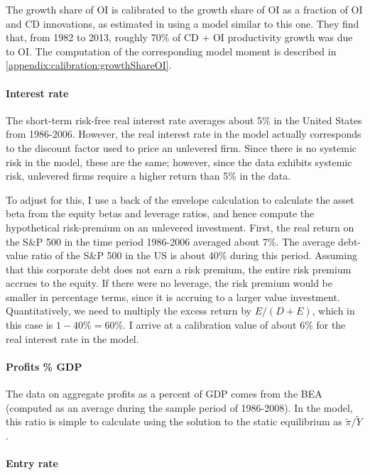 \documentclass[11pt,english]{article}
\begin{document}
The growth share of OI is calibrated to the growth share of OI as a fraction of OI and CD innovations, as estimated in \cite{klenow_innovative_2020} using a model similar to this one. They find that, from 1982 to 2013, roughly 70\% of CD + OI productivity growth was due to OI. The computation of the corresponding model moment is described in \ref{appendix:calibration:growthShareOI}.


\paragraph{Interest rate}

The short-term risk-free real interest rate averages about 5\% in the United States from 1986-2006. However, the real interest rate in the model actually corresponds to the discount factor used to price an unlevered firm. Since there is no systemic risk in the model, these are the same; however, since the data exhibits systemic risk, unlevered firms require a higher return than 5\% in the data. 

To adjust for this, I use a back of the envelope calculation to calculate the asset beta from the equity betas and leverage ratios, and hence compute the hypothetical risk-premium on an unlevered investment. First, the real return on the S\&P 500 in the time period 1986-2006 averaged about 7\%. The average debt-value ratio of the S\&P 500 in the US is about 40\% during this period. Assuming that this corporate debt does not earn a risk premium, the entire risk premium accrues to the equity. If there were no leverage, the risk premium would be smaller in percentage terms, since it is accruing to a larger value investment. Quantitatively, we need to multiply the excess return by $E / (D + E)$, which in this case is $1 - 40\% = 60\%$. I arrive at a calibration value of about 6\% for the real interest rate in the model.

\paragraph{Profits \% GDP} 

The data on aggregate profits as a percent of GDP comes from the BEA (computed as an average during the sample period of 1986-2008). In the model, this ratio is simple to calculate using the solution to the static equilibrium as $\tilde{\pi} / \tilde{Y}$.



\paragraph{Entry rate}
\end{document}
